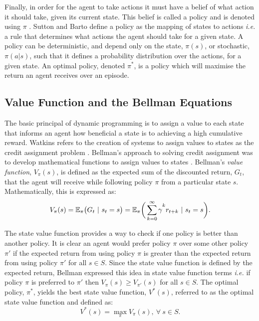 Finally, in order for the agent to take actions it must have a belief of what action it should take, given its current state. This belief is called a policy and is denoted using $\pi$ \cite{Sutton2018}. Sutton and Barto define a  policy as the mapping of states to actions \textit{i.e.} a rule that determines what actions the agent should take for a given state. A policy can be deterministic, and depend only on the state, $\pi(s)$, or stochastic, $\pi(a|s)$, such that it defines a probability distribution over the actions, for a given state. An optimal policy, denoted $\pi^*$, is a policy which will maximise the return an agent receives over an episode.


\subsection{Value Function and the Bellman Equations}
The basic principal of dynamic programming is to assign a value to each state that informs an agent how beneficial a state is to achieving a high cumulative reward. Watkins refers to the creation of systems to assign values to states as the credit assignment problem \cite{Watkins1989}. Bellman's approach to solving credit assignment was to develop mathematical functions to assign values to states \cite{Bellm1954}. Bellman's \textit{value function}, $V_{\pi}(s)$, is defined as the expected sum of the discounted return, $G_t$, that the agent will receive while following policy $\pi$ from a particular state $s$. Mathematically, this is expressed as:
\begin{equation}
	V_{\pi}(s) = \mathbb{E}_{\pi} \big( G_t \ | \ s_t = s \big) = \mathbb{E}_{\pi} \bigg( \sum_{k = 0}^{\infty} \gamma\mystrut^k r_{t+k} \ | \ s_t = s \bigg). \label{eq:205}
\end{equation}

The state value function provides a way to check if one policy is better than another policy. It is clear an agent would prefer policy $\pi$ over some other policy $\pi'$ if the expected return from using policy $\pi$ is greater than the expected return from using policy $\pi'$ for all $s \in S$. Since the state value function is defined by the expected return, Bellman expressed this idea in state value function terms \textit{i.e.} if policy $\pi$ is preferred to $\pi'$ then $V_{\pi}(s) \geq V_{\pi'}(s)$ for all $s \in S$. The optimal policy, $\pi^*$, yields the best state value function, $V^*(s)$, referred to as the optimal state value function and defined as:
\begin{equation}
	V^*(s) = \max_{\pi} V_{\pi}(s), \ \forall \ s \in S.
\end{equation}

